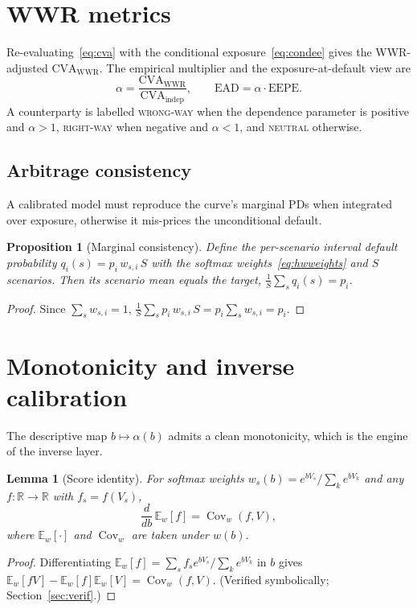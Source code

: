 \documentclass[twocolumn,10pt]{article}
\newtheorem{proposition}{Proposition}
\newtheorem{lemma}{Lemma}
\newcommand{\E}{\mathbb{E}}
\newcommand{\Cov}{\operatorname{Cov}}
\newcommand{\EEPE}{\mathrm{EEPE}}
\newcommand{\CVA}{\mathrm{CVA}}
\newcommand{\EAD}{\mathrm{EAD}}
\begin{document}
\section{WWR metrics}\label{sec:metrics}
Re-evaluating~\eqref{eq:cva} with the conditional exposure~\eqref{eq:condee}
gives the WWR-adjusted $\CVA_{\text{WWR}}$. The empirical multiplier and the
exposure-at-default view are
\begin{equation}
\alpha=\frac{\CVA_{\text{WWR}}}{\CVA_{\text{indep}}},\qquad
\EAD=\alpha\cdot\EEPE .
\end{equation}
A counterparty is labelled \textsc{wrong-way} when the dependence parameter is
positive and $\alpha>1$, \textsc{right-way} when negative and $\alpha<1$, and
\textsc{neutral} otherwise.

\subsection{Arbitrage consistency}
A calibrated model must reproduce the curve's marginal PDs when integrated over
exposure, otherwise it mis-prices the unconditional default.

\begin{proposition}[Marginal consistency]\label{prop:marg}
Define the per-scenario interval default probability
$q_i(s)=p_i\,w_{s,i}\,S$ with the softmax weights~\eqref{eq:hwweights} and
$S$ scenarios. Then its scenario mean equals the target,
$\tfrac{1}{S}\sum_s q_i(s)=p_i$.
\end{proposition}
\begin{proof}
Since $\sum_s w_{s,i}=1$,
$\tfrac1S\sum_s p_i\,w_{s,i}\,S=p_i\sum_s w_{s,i}=p_i.$
\end{proof}

\section{Monotonicity and inverse calibration}\label{sec:inverse}
The descriptive map $b\mapsto\alpha(b)$ admits a clean monotonicity, which is
the engine of the inverse layer.

\begin{lemma}[Score identity]\label{lem:cov}
For softmax weights $w_s(b)=e^{bV_s}/\sum_k e^{bV_k}$ and any
$f:\mathbb{R}\to\mathbb{R}$ with $f_s=f(V_s)$,
\begin{equation}
\frac{d}{db}\,\E_{w}[f]=\Cov_{w}(f,V),
\end{equation}
where $\E_w[\cdot]$ and $\Cov_w$ are taken under $w(b)$.
\end{lemma}
\begin{proof}
Differentiating $\E_w[f]=\sum_s f_s e^{bV_s}/\sum_k e^{bV_k}$ in $b$ gives
$\E_w[fV]-\E_w[f]\E_w[V]=\Cov_w(f,V)$. (Verified symbolically;
Section~\ref{sec:verif}.)
\end{proof}
\end{document}
